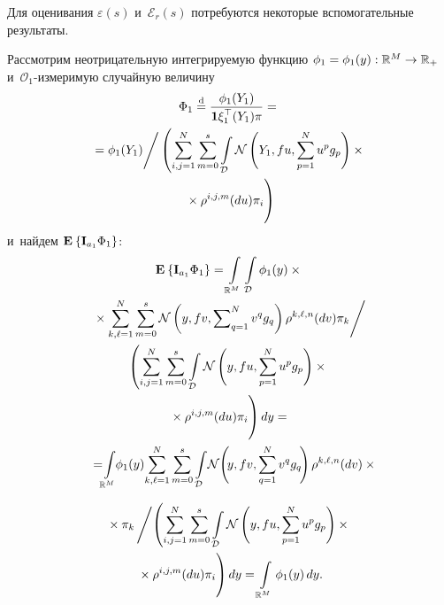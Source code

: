 \begin{multicols}{2}
 Для оценивания $\varepsilon(s)$ и~$\mathcal{E}_r(s)$ потребуются 
 некоторые вспомогательные результаты.
 
 Рассмотрим неотрицательную интегрируемую функцию $\phi_1\hm=\phi_1(y): 
 \mathbb{R}^M \hm\to \mathbb{R}_+$ и~$\mathcal{O}_1$-из\-ме\-ри\-мую случайную величину
 \begin{multline*}
 \Phi_1 \eqd \fr{\phi_1(Y_1)}{\mathbf{1}\xi_1^{\top}(Y_1)\pi}={}\\
 {}=
 \phi_1(Y_1)\Bigg/
 \left(\sum\limits_{i,j=1}^{N}\sum\limits_{m=0}^{s}\int\limits_{\mathcal{D}}
  \mathcal{N}\left(Y_1,fu,\sum\limits_{p=1}^Nu^p g_p\right)\times{}\right.\\
\left.  {}\times{}\rho^{i,j,m}(du)\pi_i
\vphantom{\int\limits_{\mathcal{D}}}
  \right)
 \end{multline*}
 и~найдем $\mathbf{E}_{  }\left\{ \mathop{\mathbf{I}_{a_1}\Phi_1} \right\}$:
 \begin{multline*}
 \me{}{\mathbf{I}_{a_1}\Phi_1} =
 \int\limits_{\mathbb{R}^M}\int\limits_{\mathcal{D}}
 \phi_1(y)\times{}\\
 {}\times
 \sum\limits_{k,\ell=1}^{N}
 \sum\limits_{m=0}^{s}\mathcal{N}
 \left(y,fv,\sum\nolimits_{q=1}^Nv^q g_q\right)\rho^{k,\ell,n}(dv)\pi_k\Bigg/\\
  \left(
 \sum\limits_{i,j=1}^{N}\sum\limits_{m=0}^{s}\int\limits_{\mathcal{D}}
  \mathcal{N}\left(y,fu,\sum\limits_{p=1}^Nu^p g_p\right)\times{}\right.\\
\left.  {}\times{}\rho^{i,j,m}(du)\pi_i
 \vphantom{\int\limits_{\mathcal{D}}}
  \right)dy
  ={} \\ 
 {}=\!\!
 \int\limits_{\mathbb{R}^M}\!\!\phi_1(y)\!
 \sum\limits_{k,\ell=1}^{N}
 \sum\limits_{m=0}^{s}\int\limits_{\mathcal{D}}\!\mathcal{N}\!
 \left(\!y,fv,\sum\limits_{q=1}^Nv^q g_q\!\right)\rho^{k,\ell,n}(dv)\times{}\hspace*{-7.17207pt}
\end{multline*}

\noindent
 \begin{multline}
 {}\times
 \pi_k\,\Bigg/\!
 \left(
 \sum\limits_{i,j=1}^{N}\sum\limits_{m=0}^{s}\int\limits_{\mathcal{D}}
  \mathcal{N}\left(y,fu,\sum\limits_{p=1}^Nu^p g_p\right)\times{}\right.\\
\left.  {}\times{}\rho^{i,j,m}(du)\pi_i
\vphantom{\int\limits_{\mathcal{D}}}
 \right) dy = \int\limits_{\mathbb{R}^M}\phi_1(y)\,dy.
 \label{eq:me_phi_1}
 \end{multline}
 

\end{multicols}
